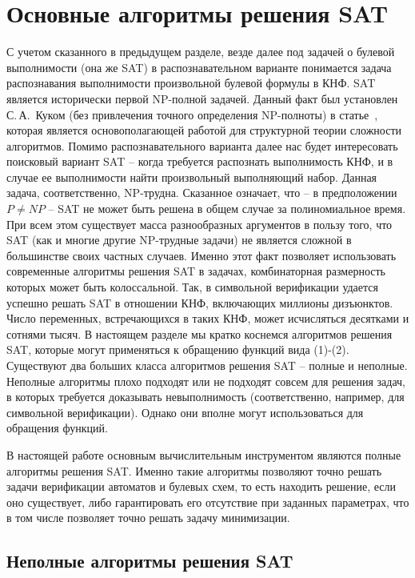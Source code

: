 \section{Основные алгоритмы решения SAT}

С учетом сказанного в предыдущем разделе, везде далее под задачей о булевой выполнимости (она же SAT) в распознавательном варианте понимается задача распознавания выполнимости произвольной булевой формулы в КНФ.
SAT является исторически первой NP-полной задачей.
Данный факт был установлен С.\,А.~Куком (без привлечения точного определения NP-полноты) в статье~\cite{cook}, которая является основополагающей работой для структурной теории сложности алгоритмов.
Помимо распознавательного варианта далее нас будет интересовать поисковый вариант SAT \--- когда требуется распознать выполнимость КНФ, и в случае ее выполнимости найти произвольный выполняющий набор.
Данная задача, соответственно, NP-трудна.
Сказанное означает, что \--- в предположении $P \neq NP$ \--- SAT не может быть решена в общем случае за полиномиальное время.
При всем этом существует масса разнообразных аргументов в пользу того, что SAT (как и многие другие NP-трудные задачи) не является сложной в большинстве своих частных случаев.
Именно этот факт позволяет использовать современные алгоритмы решения SAT в задачах, комбинаторная размерность которых может быть колоссальной.
Так, в символьной верификации удается успешно решать SAT в отношении КНФ, включающих миллионы дизъюнктов.
Число переменных, встречающихся в таких КНФ, может исчисляться десятками и сотнями тысяч.
В настоящем разделе мы кратко коснемся алгоритмов решения SAT, которые могут применяться к обращению функций вида (1)-(2).
Существуют два больших класса алгоритмов решения SAT \--- полные и неполные.
Неполные алгоритмы плохо подходят или не подходят совсем для решения задач, в которых требуется доказывать невыполнимость (соответственно, например, для символьной верификации).
Однако они вполне могут использоваться для обращения функций.

В настоящей работе основным вычислительным инструментом являются полные алгоритмы решения SAT.
Именно такие алгоритмы позволяют точно решать задачи верификации автоматов и булевых схем, то есть находить решение, если оно существует, либо гарантировать его отсутствие при заданных параметрах, что в том числе позволяет точно решать задачу минимизации.


\subsection{Неполные алгоритмы решения SAT}

